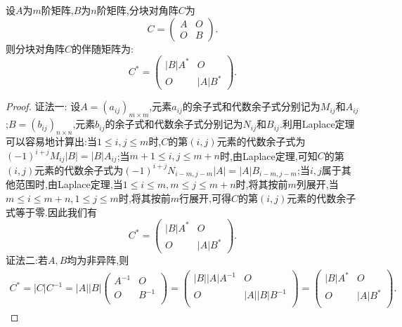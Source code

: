 \documentclass[../../main.tex]{subfiles}%
\begin{document}
\begin{proposition}[分块矩阵的伴随矩阵]\label{proposition:分块矩阵的伴随矩阵}
设\(A\)为\(m\)阶矩阵,\(B\)为\(n\)阶矩阵,分块对角阵\(C\)为
\[
C = 
\begin{pmatrix}
A & O \\
O & B
\end{pmatrix}.
\]
则分块对角阵$C$的伴随矩阵为:
\[
C^* = 
\begin{pmatrix}
|B|A^* & O \\
O & |A|B^*
\end{pmatrix}.
\]
\end{proposition}
\begin{proof}

{\color{blue}证法一:}
设\(A = (a_{ij})_{m\times m}\),元素\(a_{ij}\)的余子式和代数余子式分别记为\(M_{ij}\)和\(A_{ij}\);\(B = (b_{ij})_{n\times n}\),元素\(b_{ij}\)的余子式和代数余子式分别记为\(N_{ij}\)和\(B_{ij}\).利用Laplace定理可以容易地计算出:当\(1 \leqslant  i, j \leqslant  m\)时,\(C\)的第\((i, j)\)元素的代数余子式为\((-1)^{i + j}M_{ij}|B| = |B|A_{ij}\);当\(m + 1 \leqslant  i, j \leqslant  m + n\)时,由Laplace定理,可知\(C\)的第\((i, j)\)元素的代数余子式为\((-1)^{i + j}N_{i - m, j - m}|A| = |A|B_{i - m, j - m}\);当\(i, j\)属于其他范围时,由Laplace定理,当$1\leqslant  i\leqslant  m,m\leqslant  j\leqslant  m+n$时,将其按前$m$列展开,当$m\leqslant  i\leqslant  m+n,1\leqslant  j\leqslant  m$时,将其按前$m$行展开,可得\(C\)的第\((i, j)\)元素的代数余子式等于零.因此我们有
\[
C^* = 
\begin{pmatrix}
|B|A^* & O \\
O & |A|B^*
\end{pmatrix}.
\]
{\color{blue}证法二:}若\(A,B\)均为非异阵,则
\begin{align*}
C^*=\left| C \right|C^{-1}=\left| A \right|\left| B \right|\left( \begin{matrix}
A^{-1}&		O\\
O&		B^{-1}\\
\end{matrix} \right) =\left( \begin{matrix}
\left| B \right|\left| A \right|A^{-1}&		O\\
O&		\left| A \right|\left| B \right|B^{-1}\\
\end{matrix} \right) =\left( \begin{matrix}
|B|A^*&		O\\
O&		|A|B^*\\
\end{matrix} \right) .
\end{align*}


\end{proof}
\end{document}
